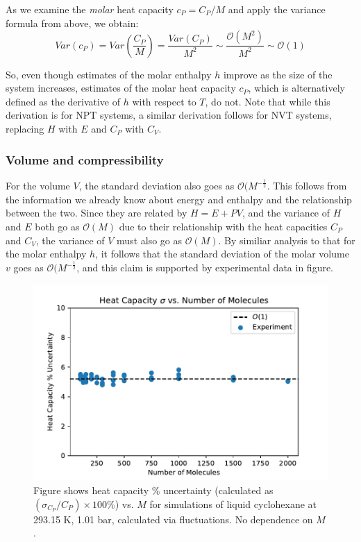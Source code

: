 \documentclass[aps,pre,twocolumn,nofootinbib,superscriptaddress,linenumbers,10pt, draft,tightenlines]{revtex4-1}
\begin{document}
As we examine the \emph{molar} heat capacity $c_P=C_P/M$ and apply the variance formula from above, we obtain:
\begin{equation}
Var(c_P) = Var(\frac{C_P}{M}) = \frac{Var(C_P)}{M^2}  \sim \frac{\mathcal{O}(M^2)}{M^2} \sim \mathcal{O}(1)
\end{equation}

So, even though estimates of the molar enthalpy $h$ improve as the size of the system increases, estimates of the molar heat capacity $c_P$, which is alternatively defined as the derivative of $h$ with respect to $T$, do not.  Note that while this derivation is for NPT systems, a similar derivation follows for NVT systems, replacing $H$ with $E$ and $C_P$ with $C_V$.

\subsubsection{Volume and compressibility}

For the volume $V$, the standard deviation also goes as $\mathcal{O}(M^{-\frac{1}{2}}$.  This follows from the information we already know about energy and enthalpy and the relationship between the two.  Since they are related by $H=E+PV$, and the variance of $H$ and $E$ both go as $\mathcal{O}(M)$ due to their relationship with the heat capacities $C_P$ and $C_V$, the variance of $V$ must also go as $\mathcal{O}(M)$.  By similiar analysis to that for the molar enthalpy $h$, it follows that the standard deviation of the molar volume $v$ goes as $\mathcal{O}(M^{-\frac{1}{2}}$, and this claim is supported by experimental data in figure. %
\begin{figure}[H]
\includegraphics[width=\textwidth-40pt]{cp_stdev_vs_number_of_molecules.pdf}
\caption{Figure shows heat capacity \% uncertainty (calculated as $(\sigma_{C_P}/C_P) \times 100 \%$) vs. $M$ for simulations of liquid cyclohexane at 293.15 K, 1.01 bar, calculated via fluctuations. No dependence on $M$.}
\end{figure}
\end{document}
